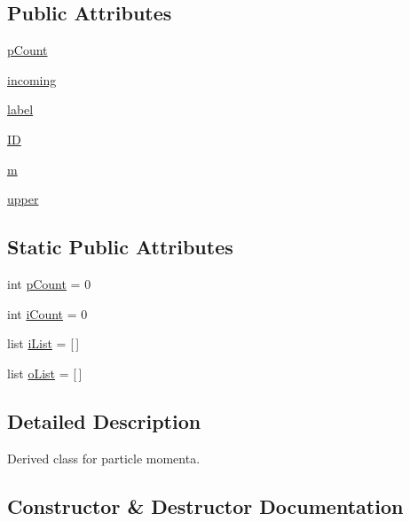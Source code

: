 \subsection*{Public Attributes}
\begin{DoxyCompactItemize}
\item 
\hyperlink{class_py_spinor_1_1_momenta_1_1_momenta_a47a027268693ec412866afb5ec99c6ac}{p\+Count}
\item 
\hyperlink{class_py_spinor_1_1_momenta_1_1_momenta_a642dd7f01f97afc7fb43e23c15b9e576}{incoming}
\item 
\hyperlink{class_py_spinor_1_1_momenta_1_1_momenta_a8365280594940c7a2bc30bfd6d247361}{label}
\item 
\hyperlink{class_py_spinor_1_1_momenta_1_1_momenta_aea79186448bbfcd670922e1aa315ec48}{I\+D}
\item 
\hyperlink{class_py_spinor_1_1_momenta_1_1_momenta_a37f0257e8d4157a9df6d7cb893209ed5}{m}
\item 
\hyperlink{class_py_spinor_1_1_momenta_1_1_momenta_aec5ba529ec5c2c293dd3629aca2555f7}{upper}
\end{DoxyCompactItemize}
\subsection*{Static Public Attributes}
\begin{DoxyCompactItemize}
\item 
int \hyperlink{class_py_spinor_1_1_momenta_1_1_momenta_a4014a366badf6e2ab61a9f17812be24d}{p\+Count} = 0
\item 
int \hyperlink{class_py_spinor_1_1_momenta_1_1_momenta_a51a30a9ee288e132d5fc662ce118e49a}{i\+Count} = 0
\item 
list \hyperlink{class_py_spinor_1_1_momenta_1_1_momenta_a48dd0e5ea8fa35c0826b595a57151331}{i\+List} = \mbox{[}$\,$\mbox{]}
\item 
list \hyperlink{class_py_spinor_1_1_momenta_1_1_momenta_a52ae72a567ca41d83942ce5bcf840f6b}{o\+List} = \mbox{[}$\,$\mbox{]}
\end{DoxyCompactItemize}


\subsection{Detailed Description}
Derived class for particle momenta. 

\subsection{Constructor \& Destructor Documentation}
\hypertarget{class_py_spinor_1_1_momenta_1_1_momenta_a58f6631f07a77727193b8cd3040869b2}{}
